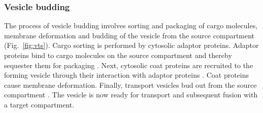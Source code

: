 \subsubsection{Vesicle budding} 
The process of vesicle budding involves sorting and packaging of cargo molecules, membrane deformation and budding of the vesicle from the source compartment (Fig.~\ref{fig:vts}). 
%
Cargo sorting is performed by cytosolic adaptor proteins. 
%
Adaptor proteins bind to cargo molecules on the source
compartment and thereby sequester them for packaging \cite{paczkowski2015cargo}. 
%
Next, cytosolic coat proteins are recruited to the forming vesicle through their interaction with adaptor proteins \cite{faini2013vesicle}. 
%
Coat proteins cause membrane deformation. 
%
Finally, transport vesicles bud out from the source
compartment \cite{cocucci2014dynamin}. 
%
The vesicle is now ready for transport and subsequent fusion with a target compartment.
%
%

